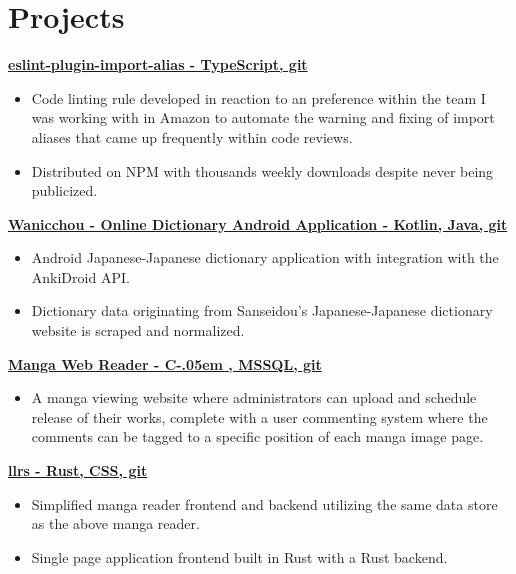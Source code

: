 \documentclass[letterpaper,11pt]{article}
\newcommand{\resumeItem}[2]{
    \vspace{-2pt}
    \item\small{
        \textbf{#1}{ #2 \vspace{-2pt}}
    }
}
\newcommand{\resumeItemListStart}{\begin{itemize}}
\newcommand{\resumeItemListEnd}{\end{itemize}}
\newcommand{\Csharp}{%
  {\settoheight{\dimen0}{C}C\kern-.05em \resizebox{!}{\dimen0}{\raisebox{\depth}{\#}}}}
\begin{document}
\section{\textbf{Projects}}
    \small{\textbf{
        \href {
            https://github.com/Limegrass/eslint-plugin-import-alias
        } {
            eslint-plugin-import-alias - TypeScript, git
        }}}
    \resumeItemListStart
        \resumeItem{}
            {
                Code linting rule developed in reaction to an preference within the team I was working with in Amazon
                to automate the warning and fixing of import aliases that came up frequently within code reviews.
            }
        \resumeItem{}
            {
                Distributed on NPM with thousands weekly downloads despite never being publicized.
            }
    \resumeItemListEnd
    \small{\textbf{
        \href {
            https://github.com/Limegrass/Wanicchou
        } {
            Wanicchou - Online Dictionary Android Application
            - Kotlin, Java, git
        }}}
    \resumeItemListStart
        \resumeItem{}
            {
                Android Japanese-Japanese dictionary application with integration with the AnkiDroid API.
            }
        \resumeItem{}
            {
                Dictionary data originating from Sanseidou's Japanese-Japanese
                dictionary website is scraped and normalized.
            }
    \resumeItemListEnd
    \small{\textbf{
        \href{
            https://waifusims.com/Manga/Hakoiri
        }{
            Manga Web Reader
            - \Csharp, MSSQL, git
        }}}
    \resumeItemListStart
        \resumeItem{}
            {
                A manga viewing website where administrators can upload and schedule
                release of their works, complete with a user commenting system
                where the comments can be tagged to a specific position of each manga
                image page.
            }
    \resumeItemListEnd
    \small{\textbf{
        \href {
            https://github.com/Limegrass/llrs
        } {
            llrs - Rust, CSS, git
        }}}
    \resumeItemListStart
        \resumeItem{}
            {
                Simplified manga reader frontend and backend utilizing the same data store as the above manga reader.
            }
        \resumeItem{}
            {
                Single page application frontend built in Rust with a Rust backend.
            }
    \resumeItemListEnd
\end{document}
